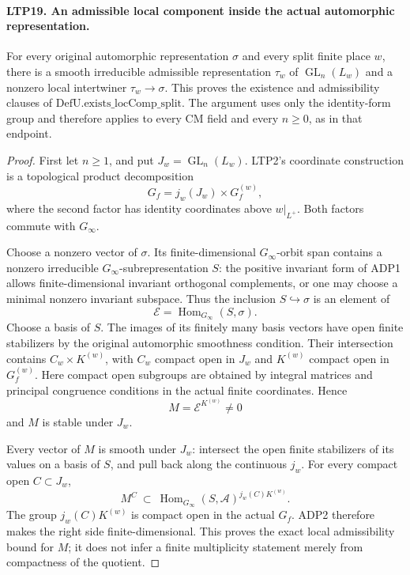\paragraph{LTP19. An admissible local component inside the actual automorphic representation.}
\label{claim:LTP19}
For every original automorphic representation \(\sigma\) and
every split finite place \(w\), there is a smooth irreducible
admissible representation \(\tau_w\) of
\(\operatorname{GL}_n(L_w)\) and a nonzero local intertwiner
\(\tau_w\to\sigma\).  This proves the existence and admissibility
clauses of \(\mathrm{DefU.exists\_locComp\_split}\).
The argument uses only the identity-form group and therefore
applies to every CM field and every \(n\ge0\), as in that endpoint.
\begin{proof}
First let \(n\ge1\), and put \(J_w=\operatorname{GL}_n(L_w)\).
LTP2's coordinate construction is a topological product
decomposition
\[
                    G_f=j_w(J_w)\times G_f^{(w)} ,
\]
where the second factor has identity coordinates above
\(w|_{L^+}\).  Both factors commute with \(G_\infty\).

Choose a nonzero vector of \(\sigma\).  Its finite-dimensional
\(G_\infty\)-orbit span contains a nonzero irreducible
\(G_\infty\)-subrepresentation \(S\): the positive invariant form
of ADP1 allows finite-dimensional invariant orthogonal
complements, or one may choose a minimal nonzero invariant
subspace.  Thus the inclusion \(S\hookrightarrow\sigma\) is
an element of
\[
                \mathcal E=\operatorname{Hom}_{G_\infty}(S,\sigma).
\]
Choose a basis of \(S\).  The images of its finitely many basis
vectors have open finite stabilizers by the original automorphic
smoothness condition.  Their intersection contains
\(C_w\times K^{(w)}\), with \(C_w\) compact open in \(J_w\)
and \(K^{(w)}\) compact open in \(G_f^{(w)}\).
Here compact open subgroups are obtained by integral matrices
and principal congruence conditions in the actual finite
coordinates.  Hence
\[
                       M=\mathcal E^{K^{(w)}}\ne0
\]
and \(M\) is stable under \(J_w\).

Every vector of \(M\) is smooth under \(J_w\): intersect the
open finite stabilizers of its values on a basis of \(S\), and
pull back along the continuous \(j_w\).
For every compact open \(C\subset J_w\),
\[
    M^C\ \subset\
       \operatorname{Hom}_{G_\infty}(S,\mathcal A)^{
                                      j_w(C)K^{(w)}} .
\]
The group \(j_w(C)K^{(w)}\) is compact open in the actual \(G_f\).
ADP2 therefore makes the right side finite-dimensional.
This proves the exact local admissibility bound for \(M\);
it does not infer a finite multiplicity statement merely from
compactness of the quotient.


\end{proof}
